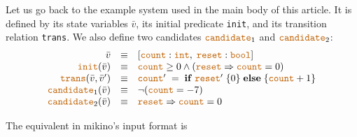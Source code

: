 \documentclass{easychair}
\newcommand{\mkn}{mikino}
\newcommand{\mbld}[1]{\mathbf{#1}}
\newcommand{\code}[1]{\textcolor{orange!75!black}{\texttt{#1}}}
\newcommand{\vars}{\bar{v}}
\newcommand{\tyint}{\code{int}}
\newcommand{\tybool}{\code{bool}}
\newcommand{\init}{\code{init}}
\newcommand{\trans}{\code{trans}}
\newcommand{\cand}{\code{candidate}}
\newcommand{\impl}{\Rightarrow}
\begin{document}
Let us go back to the example system used in the main body of this article. It is defined by its
state variables \(\vars\), its initial predicate \init{}, and its transition relation \trans{}.
We also define two candidates \(\cand_1\) and \(\cand_2\):
%
\[\begin{array}{r c l}
    \vars
        & \equiv
        & [ \code{count}: \tyint,\; \code{reset}: \tybool ]
    \\
    \init(\vars)
        & \equiv
        & \code{count} \geq 0 \land (\code{reset} \impl \code{count} = 0)
    \\
    \trans(\vars, \vars')
        & \equiv
        & \code{count}' \;=\;
            \mbld{if} \; \code{reset}' \; \{ 0 \} \;
            \mbld{else} \; \{ \code{count} + 1 \}
    \\
    \cand_1(\vars)
        & \equiv
        & \neg(\code{count} = -7)
    \\
    \cand_2(\vars)
        & \equiv
        & \code{reset} \impl \code{count} = 0
    \\
\end{array}\]

The equivalent in \mkn{}'s input format is
\end{document}
